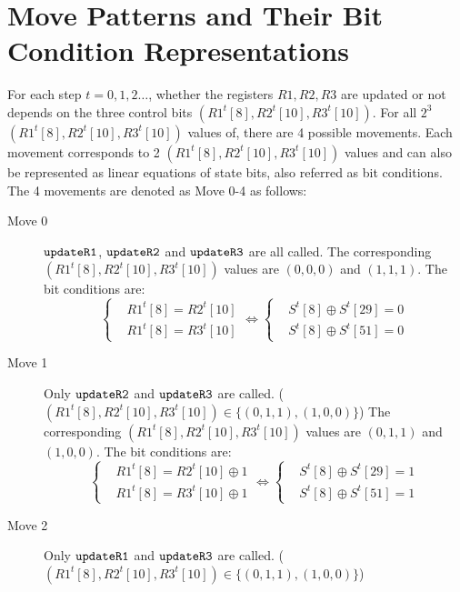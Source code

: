 \section{Move Patterns and Their Bit Condition Representations}
For each step $t=0,1,2\ldots$, whether the registers $R1,R2,R3$ are updated or not depends on the three control bits $(R1^t[8],R2^t[10],R3^t[10])$. 
For all $2^3$ $(R1^t[8],R2^t[10],R3^t[10])$ values of, there are 4 possible movements. 
Each movement corresponds to 2 $(R1^t[8],R2^t[10],R3^t[10])$ values and can also be represented as linear equations of state bits, also referred as bit conditions. 
The 4 movements are denoted as Move 0-4 as follows:
\begin{description}
  \item[Move 0] $\tt{updateR1}$, $\tt{updateR2}$ and $\tt{updateR3}$ are all called. 
  The corresponding $(R1^t[8],R2^t[10],R3^t[10])$ values are $(0,0,0)$ and $(1,1,1)$.
  The bit conditions are:
  \begin{equation}\label{eq:Move0BitCondition}
    \left\{
    \begin{aligned}
    &R1^t[8]=R2^t[10]\\
    &R1^t[8]=R3^t[10]
    \end{aligned}
    \right.
    \Leftrightarrow
    \left\{
    \begin{aligned}
    &S^t[8]\oplus S^t[29]=0\\
    &S^t[8]\oplus S^t[51]=0
    \end{aligned}
    \right.
  \end{equation}
  \item[Move 1] Only $\tt{updateR2}$ and $\tt{updateR3}$ are called. ($(R1^t[8],R2^t[10],R3^t[10])\in \{(0,1,1),(1,0,0)\}$)
  The corresponding $(R1^t[8],R2^t[10],R3^t[10])$ values are $(0,1,1)$ and $(1,0,0)$.
  The bit conditions are:
  \begin{equation}\label{eq:Move1BitCondition}
    \left\{
    \begin{aligned}
    &R1^t[8]=R2^t[10]\oplus 1\\
    &R1^t[8]=R3^t[10]\oplus 1
    \end{aligned}
    \right.
    \Leftrightarrow
    \left\{
    \begin{aligned}
    &S^t[8] \oplus S^t[29]=1\\
    &S^t[8] \oplus S^t[51]=1
    \end{aligned}
    \right.
  \end{equation}
  \item[Move 2] Only $\tt{updateR1}$ and $\tt{updateR3}$ are called. ($(R1^t[8],R2^t[10],R3^t[10])\in \{(0,1,1),(1,0,0)\}$)

\end{description}
